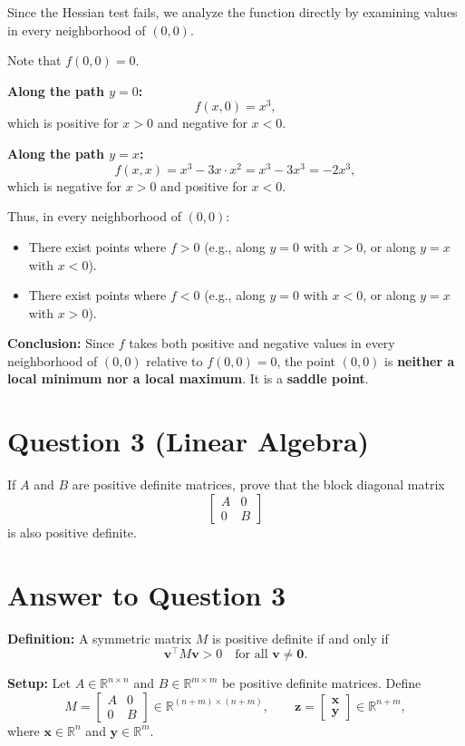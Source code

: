 \documentclass{article}
\begin{document}
Since the Hessian test fails, we analyze the function directly by examining values in every neighborhood of $(0,0)$.

Note that $f(0,0)=0$.

\textbf{Along the path $y=0$:}
\[
f(x,0)=x^3,
\]
which is positive for $x>0$ and negative for $x<0$.

\textbf{Along the path $y=x$:}
\[
f(x,x)=x^3-3x\cdot x^2=x^3-3x^3=-2x^3,
\]
which is negative for $x>0$ and positive for $x<0$.

Thus, in every neighborhood of $(0,0)$:
\begin{itemize}
    \item There exist points where $f>0$ (e.g., along $y=0$ with $x>0$, or along $y=x$ with $x<0$).
    \item There exist points where $f<0$ (e.g., along $y=0$ with $x<0$, or along $y=x$ with $x>0$).
\end{itemize}

\textbf{Conclusion:} Since $f$ takes both positive and negative values in every neighborhood of $(0,0)$ relative to $f(0,0)=0$, the point $(0,0)$ is \textbf{neither a local minimum nor a local maximum}. It is a \textbf{saddle point}.

\newpage
\section*{Question 3 (Linear Algebra)}

If $A$ and $B$ are positive definite matrices, prove that the block diagonal matrix
\[
\begin{bmatrix}
A & 0 \\
0 & B
\end{bmatrix}
\]
is also positive definite.

\section*{Answer to Question 3}

\textbf{Definition:} A symmetric matrix $M$ is positive definite if and only if
\[
\mathbf{v}^\top M \mathbf{v} > 0 \quad \text{for all } \mathbf{v} \neq \mathbf{0}.
\]

\textbf{Setup:} Let $A\in\mathbb{R}^{n\times n}$ and $B\in\mathbb{R}^{m\times m}$ be positive definite matrices. Define
\[
M =
\begin{bmatrix}
A & 0 \\
0 & B
\end{bmatrix}
\in\mathbb{R}^{(n+m)\times(n+m)},
\qquad
\mathbf{z} =
\begin{bmatrix}
\mathbf{x} \\
\mathbf{y}
\end{bmatrix}
\in\mathbb{R}^{n+m},
\]
where $\mathbf{x} \in \mathbb{R}^n$ and $\mathbf{y} \in \mathbb{R}^m$.
\end{document}
